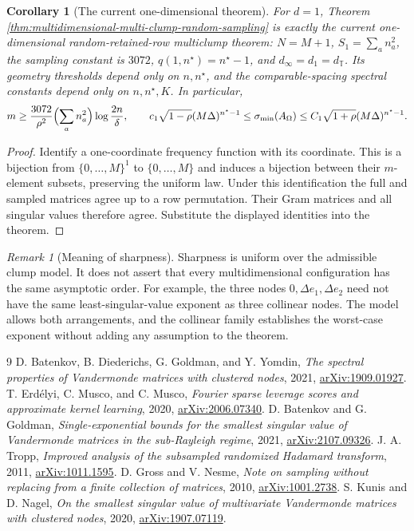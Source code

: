 \documentclass[11pt]{article}
\newtheorem{corollary}[theorem]{Corollary}
\theoremstyle{definition}\newtheorem{definition}[theorem]{Definition}
\theoremstyle{remark}\newtheorem{remark}[theorem]{Remark}
\begin{document}
\begin{corollary}[The current one-dimensional theorem]
\label{cor:one-dimensional-multi-clump-random-sampling}
For $d=1$, Theorem
\ref{thm:multidimensional-multi-clump-random-sampling} is exactly the current
one-dimensional random-retained-row multiclump theorem: $N=M+1$,
$S_1=\sum_a n_a^2$, the sampling constant is $3072$,
$q(1,n^\star)=n^\star-1$, and
$d_\infty=d_1=d_{\mathbb T}$. Its geometry thresholds depend only on $n,n^\star$,
and the comparable-spacing spectral constants depend only on
$n,n^\star,K$. In particular,
\[
 m\ge\frac{3072}{\rho^2}\Bigl(\sum_a n_a^2\Bigr)\log\frac{2n}{\delta},
 \qquad
 c_1\sqrt{1-\rho}(M\Delta)^{n^\star-1}
 \le\sigma_{\min}(A_\Omega)
 \le C_1\sqrt{1+\rho}(M\Delta)^{n^\star-1}.
\]
\end{corollary}
\begin{proof}
Identify a one-coordinate frequency function with its coordinate. This is
a bijection from $\{0,\ldots,M\}^1$ to $\{0,\ldots,M\}$ and induces a
bijection between their $m$-element subsets, preserving the uniform law.
Under this identification the full and sampled matrices agree up to a
row permutation. Their Gram matrices and all singular values therefore
agree. Substitute the displayed identities into the theorem.
\end{proof}

\begin{remark}[Meaning of sharpness]
Sharpness is uniform over the admissible clump model. It does not assert
that every multidimensional configuration has the same asymptotic order.
For example, the three nodes $0,\Delta e_1,\Delta e_2$ need not have the
same least-singular-value exponent as three collinear nodes. The model
allows both arrangements, and the collinear family establishes the
worst-case exponent without adding any assumption to the theorem.
\end{remark}

\begin{thebibliography}{9}
D. Batenkov, B. Diederichs, G. Goldman, and Y. Yomdin,
\emph{The spectral properties of Vandermonde matrices with clustered nodes},
2021, \href{https://arxiv.org/abs/1909.01927}{arXiv:1909.01927}.
T. Erd\'elyi, C. Musco, and C. Musco,
\emph{Fourier sparse leverage scores and approximate kernel learning},
2020, \href{https://arxiv.org/abs/2006.07340}{arXiv:2006.07340}.
D. Batenkov and G. Goldman,
\emph{Single-exponential bounds for the smallest singular value of
Vandermonde matrices in the sub-Rayleigh regime},
2021, \href{https://arxiv.org/abs/2107.09326}{arXiv:2107.09326}.
J. A. Tropp, \emph{Improved analysis of the subsampled randomized Hadamard
transform}, 2011, \href{https://arxiv.org/abs/1011.1595}{arXiv:1011.1595}.
D. Gross and V. Nesme, \emph{Note on sampling without replacing from a
finite collection of matrices}, 2010,
\href{https://arxiv.org/abs/1001.2738}{arXiv:1001.2738}.
S. Kunis and D. Nagel, \emph{On the smallest singular value of multivariate
Vandermonde matrices with clustered nodes}, 2020,
\href{https://arxiv.org/abs/1907.07119}{arXiv:1907.07119}.
\end{thebibliography}
\end{document}
